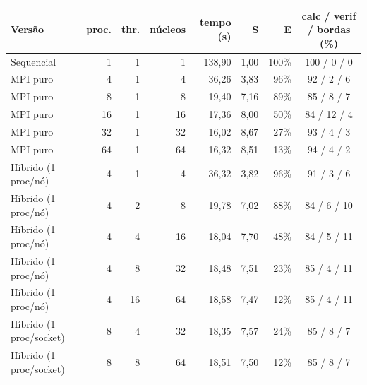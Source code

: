 \begin{tabular}{lrrrrrrc}
\toprule
Versão & proc. & thr. & núcleos & tempo (s) & S & E & calc / verif / bordas (\%) \\
\midrule
Sequencial & 1 & 1 & 1 & 138,90 & 1,00 & 100\% & 100 / 0 / 0 \\
MPI puro & 4 & 1 & 4 & 36,26 & 3,83 & 96\% & 92 / 2 / 6 \\
MPI puro & 8 & 1 & 8 & 19,40 & 7,16 & 89\% & 85 / 8 / 7 \\
MPI puro & 16 & 1 & 16 & 17,36 & 8,00 & 50\% & 84 / 12 / 4 \\
MPI puro & 32 & 1 & 32 & 16,02 & 8,67 & 27\% & 93 / 4 / 3 \\
MPI puro & 64 & 1 & 64 & 16,32 & 8,51 & 13\% & 94 / 4 / 2 \\
Híbrido (1 proc/nó) & 4 & 1 & 4 & 36,32 & 3,82 & 96\% & 91 / 3 / 6 \\
Híbrido (1 proc/nó) & 4 & 2 & 8 & 19,78 & 7,02 & 88\% & 84 / 6 / 10 \\
Híbrido (1 proc/nó) & 4 & 4 & 16 & 18,04 & 7,70 & 48\% & 84 / 5 / 11 \\
Híbrido (1 proc/nó) & 4 & 8 & 32 & 18,48 & 7,51 & 23\% & 85 / 4 / 11 \\
Híbrido (1 proc/nó) & 4 & 16 & 64 & 18,58 & 7,47 & 12\% & 85 / 4 / 11 \\
Híbrido (1 proc/socket) & 8 & 4 & 32 & 18,35 & 7,57 & 24\% & 85 / 8 / 7 \\
Híbrido (1 proc/socket) & 8 & 8 & 64 & 18,51 & 7,50 & 12\% & 85 / 8 / 7 \\
\bottomrule
\end{tabular}
